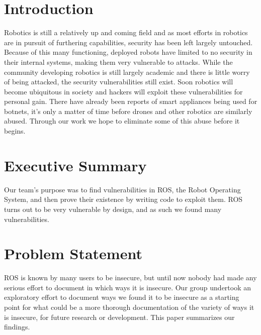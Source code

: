 \documentclass[IEEEtran,letterpaper,10pt,notitlepage,draftclsnofoot,onecolumn]{article}
\begin{document}
\newpage
{}
\tableofcontents
\clearpage

\section{Introduction}
Robotics is still a relatively up and coming field and as most efforts in robotics are in pursuit of furthering capabilities, security has been left largely untouched.
Because of this many functioning, deployed robots have limited to no security in their internal systems, making them very vulnerable to attacks.
While the community developing robotics is still largely academic and there is little worry of being attacked, the security vulnerabilities still exist.
Soon robotics will become ubiquitous in society and hackers will exploit these vulnerabilities for personal gain.
There have already been reports of smart appliances being used for botnets, it's only a matter of time before drones and other robotics are similarly abused. \cite{ddos}
Through our work we hope to eliminate some of this abuse before it begins.

\section{Executive Summary}
Our team’s purpose was to find vulnerabilities in ROS, the Robot Operating System, and then prove their existence by writing code to exploit them. ROS turns out to be very vulnerable by design, and as such we found many vulnerabilities.

\section{Problem Statement}
ROS is known by many users to be insecure, but until now nobody had made any serious effort to document in which ways it is insecure.
Our group undertook an exploratory effort to document ways we found it to be insecure as a starting point for what could be a more thorough documentation of the variety of ways it is insecure, for future research or development.
This paper summarizes our findings.
\end{document}
